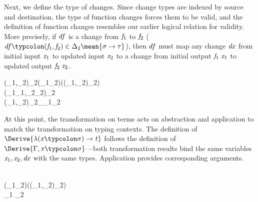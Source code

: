 Next, we define the type of changes. Since change types are indexed by source
and destination, the type of function changes forces them to be valid, and the
definition of function changes resembles our earlier logical relation for
validity.
More precisely, if \ensuremath{\Varid{df}} is a change from \ensuremath{\Varid{f}_{1}} to \ensuremath{\Varid{f}_{2}} (\ensuremath{\Varid{df}\typcolon(\Varid{f}_{1},\Varid{f}_{2})\in \Delta_2\mean{\sigma\to \tau}}), then
\ensuremath{\Varid{df}} must map any change \ensuremath{\Varid{dx}} from initial input \ensuremath{\Varid{x}_{1}} to updated input \ensuremath{\Varid{x}_{2}} to a
change from initial output \ensuremath{\Varid{f}_{1}\;\Varid{x}_{1}} to updated output \ensuremath{\Varid{f}_{2}\;\Varid{x}_{2}}.
\begin{hscode}\SaveRestoreHook
{}%
%
%
%
\>[3]{}(_{1},_{2})\in \Delta_2\mean{\sigma\to \tau}\mathrel{=}\Pi (_{1}\;_{2}\typcolon\sigma)\hsforall \;(\typcolon(_{1},_{2})\in \Delta_2\mean{\sigma})\<[E]%
\\
\>[3]{}\<[5]%
\>[5]{}(_{1}\;_{1},_{2}\;_{2})\in \Delta_2\mean{\tau}{}\<[E]%
\\
\>[3]{}(_{1},_{2})\in \Delta_2\mean{\alpha}\mathrel{=}\Delta_\alpha\;_{1}\;_{2}{}\<[E]%
\ColumnHook
\end{hscode}\resethooks
At this point, the transformation on terms acts on abstraction and application
to match the transformation on typing contexts. The definition of \ensuremath{\Derive{\lambda (\Varid{x}\typcolon\sigma)\to \Varid{t}}} follows the definition of \ensuremath{\Derive{\Gamma,\Varid{x}\typcolon\sigma}}---both
transformation results bind the same variables \ensuremath{\Varid{x}_{1},\Varid{x}_{2},\Varid{dx}} with the same types.
Application provides corresponding arguments.
\begin{hscode}\SaveRestoreHook
{}%
%
%
\>[3]{}\mathrel{=}\<[E]%
\\
\>[3]{}\mathrel{=}\lambda (_{1}\;_{2}\typcolon\sigma)\;(\typcolon(_{1},_{2})\in \Delta_2\mean{\sigma})\to {}\<[E]%
\\
\>[3]{}\mathrel{=}\;_1 \;_2 \;\<[E]%
\ColumnHook
\end{hscode}\resethooks

